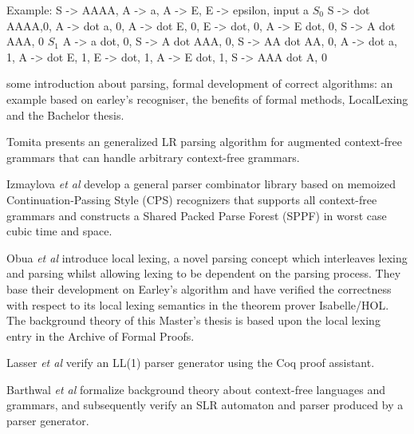 \begin{isabellebody}
\begin{isamarkuptext}
Example:
S -> AAAA, A -> a, A -> E, E -> epsilon, input a
$S_0$ S -> dot AAAA,0, A -> dot a, 0, A -> dot E, 0, E -> dot, 0, A -> E dot, 0, S -> A dot AAA, 0
$S_1$ A -> a dot, 0, S -> A dot AAA, 0, S -> AA dot AA, 0, A -> dot a, 1, A -> dot E, 1, E -> dot, 1, A -> E dot, 1, S -> AAA dot A, 0%
\end{isamarkuptext}\isamarkuptrue%
%
\isadelimdocument
%
\endisadelimdocument
%
\isatagdocument
%
\isamarkuptrue%
%
\isamarkuptrue%
%
\endisatagdocument
{\isafolddocument}%
%
\isadelimdocument
%
\endisadelimdocument
%
\begin{isamarkuptext}%
some introduction about parsing, formal development of correct algorithms: an example based on
earley's recogniser, the benefits of formal methods, LocalLexing and the Bachelor thesis.%
\end{isamarkuptext}\isamarkuptrue%
%
\isadelimdocument
%
\endisadelimdocument
%
\isatagdocument
%
\isamarkuptrue%
%
\isamarkuptrue%
%
\endisatagdocument
{\isafolddocument}%
%
\isadelimdocument
%
\endisadelimdocument
%
\begin{isamarkuptext}%
Tomita \cite{Tomita:1987} presents an generalized LR parsing algorithm for augmented
context-free grammars that can handle arbitrary context-free grammars.

Izmaylova \textit{et al} \cite{Izmaylova:2016} develop a general parser 
combinator library based on memoized Continuation-Passing Style (CPS) recognizers that supports all
context-free grammars and constructs a Shared Packed Parse Forest (SPPF) in worst case cubic time and space.%
\end{isamarkuptext}\isamarkuptrue%
%
\begin{isamarkuptext}%
Obua \textit{et al} \cite{Obua:2017} introduce local lexing, a novel parsing concept which interleaves
lexing and parsing whilst allowing lexing to be dependent on the parsing process. They base their
development on Earley's algorithm and have verified the correctness with respect to its local lexing
semantics in the theorem prover Isabelle/HOL. The background theory of this Master's thesis is based
upon the local lexing entry \cite{LocalLexing-AFP} in the Archive of Formal Proofs.

Lasser \textit{et al} \cite{Lasser:2019} verify an LL(1) parser generator using the Coq proof assistant.

Barthwal \textit{et al} \cite{Barthwal:2009} formalize background theory
about context-free languages and grammars, and subsequently verify an SLR automaton and parser produced
by a parser generator.


\end{isamarkuptext}
\end{isabellebody}
